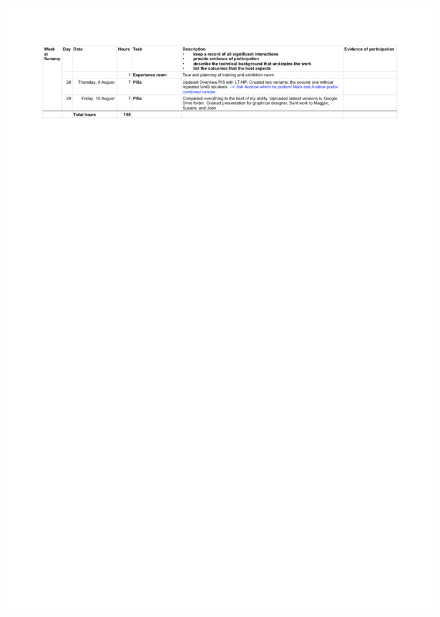 \begin{figure}
	\centering
	\includegraphics[height=\textheight]{Appendices/Log_04.png}
\end{figure}

